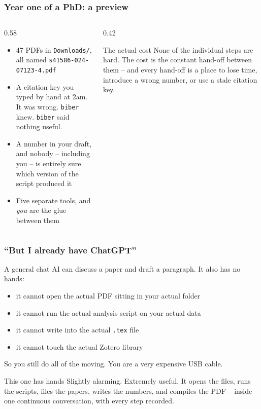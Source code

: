 \begin{frame}
\frametitle{Year one of a PhD: a preview}
\begin{minipage}{\textwidth}
\begin{columns}
\begin{column}{0.58\textwidth}
\begin{itemize}
    \item 47 PDFs in \texttt{Downloads/}, all named
          \texttt{s41586-024-07123-4.pdf}
    \item A citation key you typed by hand at 2am. It was wrong.
          \texttt{biber} knew. \texttt{biber} said nothing useful.
    \item A number in your draft, and nobody -- including you -- is
          entirely sure which version of the script produced it
    \item Five separate tools, and \emph{you} are the glue between them
\end{itemize}
\end{column}
\begin{column}{0.42\textwidth}
\begin{block}{The actual cost}
None of the individual steps are hard. The cost is the constant hand-off
between them -- and every hand-off is a place to lose time, introduce a
wrong number, or use a stale citation key.
\end{block}
\end{column}
\end{columns}
\end{minipage}
\end{frame}

\begin{frame}
\frametitle{``But I already have ChatGPT''}
A general chat AI can discuss a paper and draft a paragraph. It also
\alert{has no hands}:
\begin{itemize}
    \item it cannot open the actual PDF sitting in your actual folder
    \item it cannot run the actual analysis script on your actual data
    \item it cannot write into the actual \texttt{.tex} file
    \item it cannot touch the actual Zotero library
\end{itemize}
\vspace{2mm}
So you still do all of the moving. You are a very expensive USB cable.
\vspace{2mm}
\begin{block}{This one has hands}
Slightly alarming. Extremely useful. It opens the files, runs the scripts,
files the papers, writes the numbers, and compiles the PDF -- inside one
continuous conversation, with every step recorded.
\end{block}
\end{frame}

